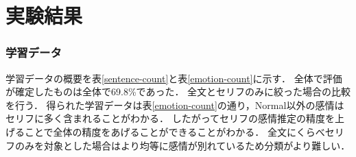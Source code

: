 \chapter{実験結果}


\subsection{学習データ}
\begin{table}[ht]
 \centering
  \caption{学習データ(物語別)}
  \vspace{0.3\baselineskip}
  \label{sentence-count}
\end{table}

\begin{table}[ht]
 \centering
  \caption{学習データ(感情別)}
  \vspace{0.3\baselineskip}
  \label{emotion-count}
\end{table}

学習データの概要を表\ref{sentence-count}と表\ref{emotion-count}に示す．
全体で評価が確定したものは全体で69.8\%であった．
全文とセリフのみに絞った場合の比較を行う．
得られた学習データは表\ref{emotion-count}の通り，Normal以外の感情はセリフに多く含まれることがわかる．
したがってセリフの感情推定の精度を上げることで全体の精度をあげることができることがわかる．
全文にくらべセリフのみを対象とした場合はより均等に感情が別れているため分類がより難しい．

